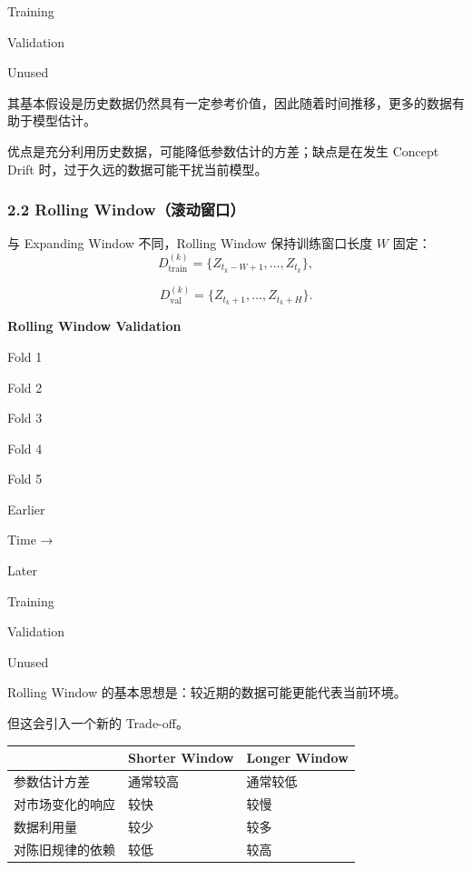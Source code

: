 Training

Validation

Unused

其基本假设是历史数据仍然具有一定参考价值，因此随着时间推移，更多的数据有助于模型估计。

优点是充分利用历史数据，可能降低参数估计的方差；缺点是在发生 Concept Drift 时，过于久远的数据可能干扰当前模型。

\hypertarget{part-2-27-0001-rolling-windowux6edaux52a8ux7a97ux53e3}{%
\subsubsection{2.2 Rolling Window（滚动窗口）}\label{part-2-27-0001-rolling-windowux6edaux52a8ux7a97ux53e3}}

与 Expanding Window 不同，Rolling Window 保持训练窗口长度 \(W\) 固定：
\[D_{\mathrm{train}}^{(k)}
=
\{Z_{t_k-W+1},\ldots,Z_{t_k}\},\]

\[D_{\mathrm{val}}^{(k)}
=
\{Z_{t_k+1},\ldots,Z_{t_k+H}\}.\]

\textbf{Rolling Window Validation}

Fold 1

Fold 2

Fold 3

Fold 4

Fold 5

Earlier

Time →

Later

Training

Validation

Unused

Rolling Window 的基本思想是：较近期的数据可能更能代表当前环境。

但这会引入一个新的 Trade-off。

\begin{readertable}
\begin{longtable}[]{@{}
  >{\raggedright\arraybackslash}p{}
  >{\raggedright\arraybackslash}p{}
  >{\raggedright\arraybackslash}p{}@{}}
\toprule
& Shorter Window & Longer Window \\
\midrule
\endhead
参数估计方差 & 通常较高 & 通常较低 \\
对市场变化的响应 & 较快 & 较慢 \\
数据利用量 & 较少 & 较多 \\
对陈旧规律的依赖 & 较低 & 较高 \\
\bottomrule
\end{longtable}
\end{readertable}

